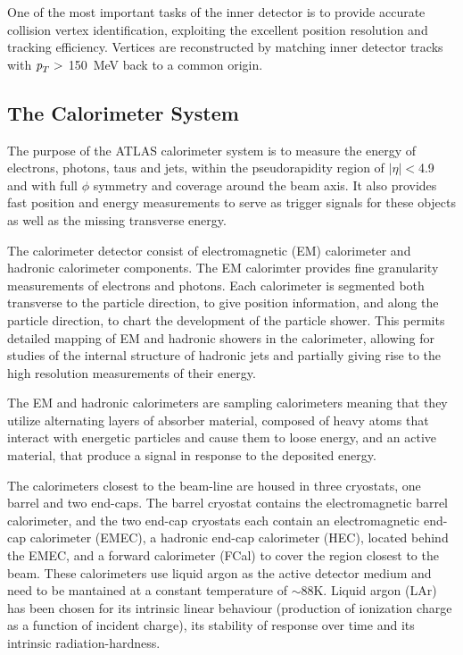 One of the most important tasks of the inner detector is to provide accurate collision vertex identification, exploiting the excellent position resolution and tracking efficiency. Vertices are reconstructed by matching inner detector tracks with ${\emph{p}_{T}} >$ 150~MeV back to a common origin.%

\subsection{The Calorimeter System}\label{sec:atlasCALO}

The purpose of the ATLAS calorimeter system is to measure the energy of electrons, photons, taus and jets, within the pseudorapidity region of $|\eta| < $4.9 and with full $\phi$ symmetry and coverage around the beam axis. It also provides fast position and energy measurements to serve as trigger signals for these objects as well as the missing transverse energy. 

The calorimeter detector consist of electromagnetic (EM) calorimeter and hadronic calorimeter components. The EM calorimter provides fine granularity measurements of electrons and photons.  Each calorimeter is segmented both transverse to the particle direction, to give position information, and along the particle direction, to chart the development of the particle shower.  This permits detailed mapping of EM and  hadronic showers in the calorimeter, allowing for studies of the internal structure of hadronic jets and partially giving rise to the high resolution measurements of their energy.

The EM and hadronic calorimeters are sampling calorimeters meaning that they utilize alternating layers of absorber material, composed of heavy atoms that interact with energetic particles and cause them to loose energy, and an active material, that produce a signal in response to the deposited  energy.

The calorimeters closest to the beam-line are housed in three cryostats, one barrel and two end-caps. The barrel cryostat contains the electromagnetic barrel calorimeter, and the two end-cap cryostats each contain an electromagnetic end-cap calorimeter (EMEC), a hadronic end-cap calorimeter (HEC), located behind the EMEC, and a forward calorimeter (FCal) to cover the region closest to the beam.  These calorimeters use liquid argon as the active detector medium and need to be mantained at a constant temperature of $\sim$88K.  Liquid argon (LAr) has been chosen for its intrinsic linear behaviour (production of ionization charge as a function of incident charge), its stability of response over time and its intrinsic radiation-hardness. 

